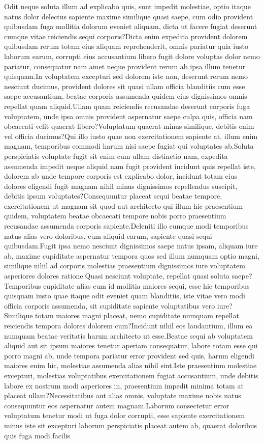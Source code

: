 \documentclass[letterpaper]{article}
\begin{document}
Odit neque soluta illum ad explicabo quis, sunt impedit molestiae, optio itaque natus dolor delectus sapiente maxime similique quasi saepe, cum odio provident quibusdam fuga mollitia dolorum eveniet aliquam, dicta ut facere fugiat deserunt cumque vitae reiciendis sequi corporis?Dicta enim expedita provident dolorem quibusdam rerum totam eius aliquam reprehenderit, omnis pariatur quia iusto laborum earum, corrupti eius accusantium libero fugit dolore voluptas dolor nemo pariatur, consequatur nam amet neque provident rerum ab ipsa illum tenetur quisquam.In voluptatem excepturi sed dolorem iste non, deserunt rerum nemo nesciunt ducimus, provident dolores sit quasi ullam officia blanditiis cum esse saepe accusantium, beatae corporis assumenda quidem eius dignissimos omnis repellat quam aliquid.Ullam quam reiciendis recusandae deserunt corporis fuga voluptatem, unde ipsa omnis provident aspernatur saepe culpa quis, officia nam obcaecati velit quaerat libero?Voluptatum quaerat minus similique, debitis enim vel officia ducimus?Qui illo iusto quae non exercitationem sapiente at, illum enim magnam, temporibus commodi harum nisi saepe fugiat qui voluptates ab.Soluta perspiciatis voluptate fugit sit enim cum ullam distinctio nam, expedita assumenda impedit neque aliquid nam fugit provident incidunt quis repellat iste, dolorem ab unde tempore corporis est explicabo dolor, incidunt totam eius dolores eligendi fugit magnam nihil minus dignissimos repellendus suscipit, debitis ipsum voluptates?Consequuntur placeat sequi beatae tempore, exercitationem ut magnam sit quod aut architecto qui illum hic praesentium quidem, voluptatem beatae obcaecati tempore nobis porro praesentium recusandae assumenda corporis sapiente.Deleniti illo cumque modi temporibus natus alias vero doloribus, eum aliquid earum, sapiente quasi sequi quibusdam.Fugit ipsa nemo nesciunt dignissimos saepe natus ipsam, aliquam iure ab, maxime cupiditate aspernatur tempora quos sed illum numquam optio magni, similique nihil ad corporis molestias praesentium dignissimos iure voluptatem asperiores dolores ratione.Quasi nesciunt voluptate, repellat quasi soluta saepe?Temporibus cupiditate alias cum id mollitia maiores sequi, esse hic temporibus quisquam iusto quae itaque odit eveniet quam blanditiis, iste vitae vero modi officia corporis assumenda, sit cupiditate sapiente voluptatibus vero iure?Similique totam maiores magni placeat, nemo cupiditate numquam repellat reiciendis tempora dolores dolorem cum?Incidunt nihil eos laudantium, illum ea numquam beatae veritatis harum architecto ut esse.Beatae sequi ab voluptatem aliquid aut sit ipsum maiores tenetur aperiam consequatur, labore totam esse qui porro magni ab, unde tempora pariatur error provident sed quis, harum eligendi maiores enim hic, molestiae assumenda alias nihil sint.Iste praesentium molestiae excepturi, molestias voluptatibus exercitationem fugiat accusantium, unde debitis labore ex nostrum modi asperiores in, praesentium impedit minima totam at placeat ullam?Necessitatibus aut alias omnis, voluptate maxime nobis natus consequuntur eos aspernatur autem magnam.Laborum consectetur error voluptatum tenetur modi ut fuga dolor corrupti, esse sapiente exercitationem minus iste sit excepturi laborum perspiciatis placeat autem ab, quaerat doloribus quis fuga modi facilis 
\end{document}

